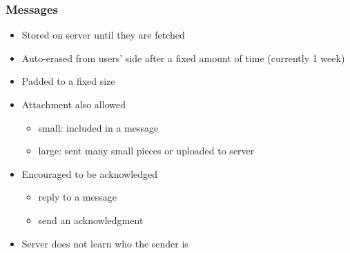 \begin{frame}
	\frametitle{Messages}

	\begin{itemize}
	\setlength\itemsep{0.5em}
	\item	Stored on server until they are fetched
	\item	Auto-erased from users' side after a fixed amount of time (currently 1 week)
	\item	Padded to a fixed size
	\item	Attachment also allowed
		\begin{itemize}
		\item	small: included in a message
		\item	large: sent many small pieces or uploaded to server
		\end{itemize}
	\item	Encouraged to be acknowledged
		\begin{itemize}
		\item	reply to a message
		\item	send an acknowledgment
		\end{itemize}
	\item	Server does not learn who the sender is
	\end{itemize}
\end{frame}



